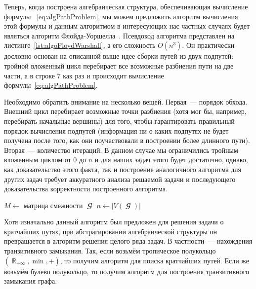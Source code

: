 Теперь, когда построена алгебраическая структура, обеспечивающая вычисление формулы~
\ref{eq:algPathProblem}, мы можем предложить алгоритм вычисления этой формулы и данным алгоритмом в интересующих нас частных случаях будет являться алгоритм Флойда-Уоршелла~.
Псевдокод алгоритма представлен на листинге~\ref{lst:algoFloydWarshall}, а его сложность $O(n^3)$.
Он практически дословно основан на описанной выше идее сборки путей из двух подпутей: тройной вложенный цикл перебирает все возможные разбиения пути на две части, а в строке 7 как раз и происходит вычисление формулы~\ref{eq:algPathProblem}.

Необходимо обратить внимание на несколько вещей.
Первая~--- порядок обхода.
Внешний цикл перебирает возможные точки разбиения (хотя мог бы, например, перебирать начальные вершины) для того, чтобы гарантировать правильный порядок вычисления подпутей (информация ни о каких подпутях не будет получена после того, как они поучаствовали в построении более длинного пути).
Вторая~--- количество итераций.
В данном случае мы ограничились тройным вложенным циклом от 0 до $n$ и для наших задач этого будет достаточно, однако, как доказательство этого факта, так и построение аналогичного алгоритма для других задач требует аккуратного анализа решаемой задачи и последующего доказательства корректности построенного алгоритма.

\begin{algorithm}
    \SetAlgoLined
    $M \leftarrow$ матрица смежности $\mbfscrG$\;
    $n \leftarrow |V(\mbfscrG)|$\;
    \;
    \caption{Алгоритм Флойда-Уоршелла}
    \label{lst:algoFloydWarshall}
\end{algorithm}

Хотя изначально данный алгоритм был предложен для решения задачи о кратчайших путях, при абстрагировании алгебраической структуры он превращается в алгоритм решения целого ряда задач.
В частности~--- нахождения транзитивного замыкания.
Так, если возьмём тропическое полукольцо $(\BbbR_{+\infty}, \min, +)$, то получим алгоритм для поиска кратчайших путей.
Если же возьмём булево полукольцо, то получим алгоритм для построения транзитивного замыкания графа.

